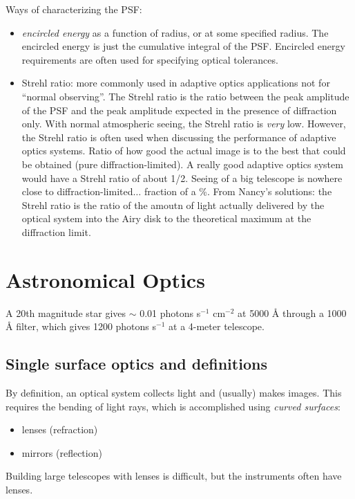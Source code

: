 \documentclass[12pt]{article}
\begin{document}
Ways of characterizing the PSF:
\begin{itemize}
    \item \emph{encircled energy} as a function of radius,
        or at some specified radius. The encircled energy is just the
        cumulative integral of the PSF\@. Encircled energy requirements
        are often used for specifying optical tolerances.
    \item Strehl ratio: more commonly used in
        adaptive optics applications \textcolor{myBlue}{not for
        ``normal observing''}. The Strehl ratio is
        the ratio between the peak amplitude of the PSF and the peak amplitude
        expected in the presence of diffraction only. With normal atmospheric
        seeing, the Strehl ratio is \emph{very} low. However, the Strehl ratio is
        often used when discussing the performance of adaptive optics
        systems. \textcolor{myBlue}{Ratio of how good the actual image is to
        the best that could be obtained (pure diffraction-limited).
        A really good adaptive optics system would have a Strehl ratio
        of about 1/2. Seeing of a big telescope is nowhere close to
        diffraction-limited$\ldots$ fraction of a \%.}
        From Nancy's solutions: the Strehl ratio is the ratio of the
        amoutn of light actually delivered by the optical system into
        the Airy disk to the theoretical maximum at the diffraction limit.

\end{itemize}
\newpage
\section{Astronomical Optics}
A 20th magnitude star gives $\sim$ 0.01 photons s$^{-1}$ cm$^{-2}$
at 5000 \AA{} through a 1000 \AA{} filter, which gives 1200
photons s$^{-1}$ at a 4-meter telescope.
\subsection{Single surface optics and definitions}
By definition, an optical system collects light
and (usually) makes images. This requires the bending
of light rays, which is accomplished using \emph{curved surfaces}:
\begin{itemize}
    \item lenses (refraction)
    \item mirrors (reflection)
\end{itemize}
Building large telescopes with lenses is difficult, but the
instruments often have lenses.
\end{document}
